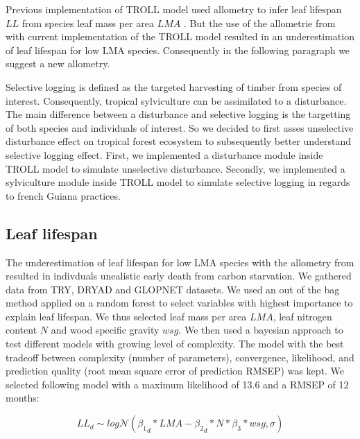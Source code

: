 \documentclass[12pt,]{article}
\theoremstyle{definition}
\theoremstyle{definition}
\theoremstyle{remark}
\begin{document}
Previous implementation of TROLL model used \citet{Reich1991a} allometry
to infer leaf lifespan \(LL\) from species leaf mass per area \(LMA\)
\citep[see \protect\hyperlink{appendix-1-troll-model}{Appendix 1: TROLL
model}]{Li}. But the use of the allometrie from \citet{Reich1991a} with
current implementation of the TROLL model resulted in an underestimation
of leaf lifespan for low LMA species. Consequently in the following
paragraph we suggest a new allometry.

Selective logging is defined as the targeted harvesting of timber from
species of interest. Consequently, tropical sylviculture can be
assimilated to a disturbance. The main difference between a disturbance
and selective logging is the targetting of both species and individuals
of interest. So we decided to first asses unselective disturbance effect
on tropical forest ecosystem to subsequently better understand selective
logging effect. First, we implemented a disturbance module inside TROLL
model to simulate unselective disturbance. Secondly, we implemented a
sylviculture module inside TROLL model to simulate selective logging in
regards to french Guiana practices.

\subsection{Leaf lifespan}\label{leaf-lifespan}

The underestimation of leaf lifespan for low LMA species with the
allometry from \citet{Reich1991a} resulted in indivduals unealistic
early death from carbon starvation. We gathered data from
TRY\citep{Kattge2011}, DRYAD \citep{chave_towards_2009} and GLOPNET
\citep{wright_worldwide_2004} datasets. We used an out of the bag method
applied on a random forest to select variables with highest importance
to explain leaf lifespan. We thus selected leaf mass per area \(LMA\),
leaf nitrogen content \(N\) and wood specific gravity \(wsg\). We then
used a bayesian approach to test different models with growing level of
complexity. The model with the best tradeoff between complexity (number
of parameters), convergence, likelihood, and prediction quality (root
mean square error of prediction RMSEP) was kept. We selected following
model with a maximum likelihood of 13.6 and a RMSEP of 12 months:

\begin{equation}
  LL_{d} \sim log\mathcal{N}({\beta_1}_d*LMA - {\beta_2}_d*N*\beta_3*wsg, \sigma)
  \label{eq:LL}
\end{equation}
\end{document}
